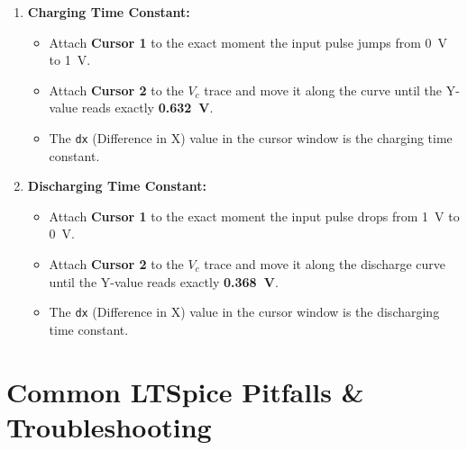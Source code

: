 \documentclass[11pt]{article}
\begin{document}
\begin{enumerate}
  \item \textbf{Charging Time Constant:}
    \begin{itemize}
      \item Attach \textbf{Cursor 1} to the exact moment the input pulse jumps from \SI{0}{\volt} to \SI{1}{\volt}.
      \item Attach \textbf{Cursor 2} to the $V_c$ trace and move it along the curve until the Y-value reads exactly \textbf{\SI{0.632}{\volt}}.
      \item The \texttt{dx} (Difference in X) value in the cursor window is the charging time constant.
    \end{itemize}

  \item \textbf{Discharging Time Constant:}
    \begin{itemize}
      \item Attach \textbf{Cursor 1} to the exact moment the input pulse drops from \SI{1}{\volt} to \SI{0}{\volt}.
      \item Attach \textbf{Cursor 2} to the $V_c$ trace and move it along the discharge curve until the Y-value reads exactly \textbf{\SI{0.368}{\volt}}.
      \item The \texttt{dx} (Difference in X) value in the cursor window is the discharging time constant.
    \end{itemize}
\end{enumerate}

\vspace{0.2in}
\section*{Common LTSpice Pitfalls \& Troubleshooting}
\end{document}
